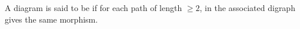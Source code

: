\documentclass{book}
\begin{document}
	
	\begin{defn}
		A diagram is said to be  if for each path of length $\geq 2$, in the associated digraph gives the same morphism.  
	\end{defn}
	
	
	
	\backmatter
	
	
	
	
	
	
	
	
	
	
	
	
	
	
\end{document}

